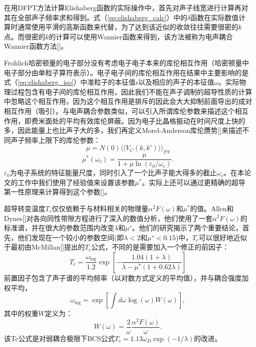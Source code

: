 \documentclass[phd,nobackinfo]{scutthesis}
\begin{document}
在用DFPT方法计算Elishaberg函数的实际操作中，首先对声子线宽进行计算再对其在全部声子频率求和得到。式（\ref{eq:elishaberg_calc}）中的$\delta$函数在实际数值计算时通常使用平滑的高斯函数来代替，为了达到该近似的收敛往往需要很密的$k$点。而很密的$k$的计算可以使用Wannier函数来得到，该方法被称为电声耦合Wannier函数方法[]。

Frohlich哈密顿量的电子部分没有考虑电子电子本来的库伦相互作用（哈密顿量中电子部分由单粒子算符表示）。电子电子间的库伦相互作用在结果中主要影响的是式（\ref{eq:elishaberg_iso}）中准粒子的本征值$\epsilon$以及相应的声子的本征值$\omega$。实际物理过程包含有电子间的库伦相互作用，因此我们不能在声子调制的超导性质的计算中忽略这个相互作用，因为这个相互作用是排斥的因此会大大抑制前面导出的成对相互作用（吸引）。与电声耦合参数类似，可以引入所谓库伦参数来描述这个相互作用，即费米面处的平均有效库伦屏蔽。因为电子比晶格振动在时间尺度上快的多，因此能量上也比声子大的多，我们再定义Morel-Anderson库伦赝势[]来描述不同声子频率上限下的库伦参数：
\begin{equation}
  \mu = N(0)\langle\langle {V_C(k,k')} \rangle\rangle_{FS}
\end{equation}
\begin{equation}
  \mu^*(\omega_c) = \frac{\mu}{1+\mu \ln(\varepsilon_0/\omega_c)}.
\end{equation}
$\varepsilon_0$为电子系统的特征能量尺度，同时引入了一个比声子能大得多的截止$\omega_c$。在本论文的工作中我们使用了经验值来设置该参数$\mu^*$。实际上还可以通过更精确的超导第一性原理来计算得到这个参数[]。

超导转变温度$T_c$仅仅依赖于与材料相关的物理量$\alpha^2 F(\omega)$和$\mu^*$的值。Allen和Dynes[]对各向同性带隙方程进行了深入的数值分析，他们使用了一套$\alpha^2 F(\omega)$的标准谱，并在很大的参数范围内改变$\lambda$和$\mu^∗$。他们的研究揭示了两个重要结论，首先，他们发现在一个较小的参数空间(即$\lambda<2$和$\mu^∗<0.15$)中，$T_c$可以很好地近似于最初由McMillan[]提出的$T_c$公式，不同的是需要加入一个修正的前因子：
\begin{equation}
  T_c = \frac{\omega_{\mathrm{log}}}{1.2}
  \exp{\left[ {-\frac{1.04(1+\lambda)}{\lambda-\mu^*(1+0.62\lambda)}} \right]}
\end{equation}
前置因子包含了声子谱的平均频率（以对数方式定义的平均值），并与耦合强度加权平均，
\begin{equation}
  \omega_\mathrm{log} = \exp \left[ {\int d\omega \log(\omega)W(\omega)} \right],
\end{equation}
其中的权重$W$定义为：
\begin{equation}
  W(\omega) = \frac{2}{\omega} \frac{\alpha^2 F(\omega)}{\omega}.
\end{equation}
该Tc公式是对弱耦合极限下BCS公式$T_c = 1.13 \omega_D \exp(−1/\lambda)$的改进。
\end{document}
